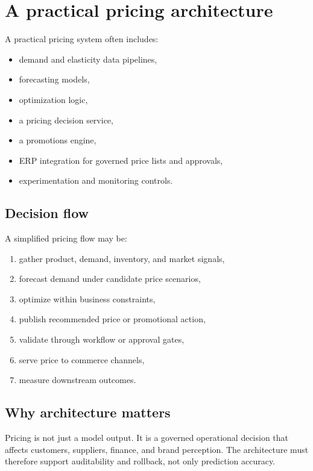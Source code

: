 \section{A practical pricing architecture}
A practical pricing system often includes:
\begin{itemize}
  \item demand and elasticity data pipelines,
  \item forecasting models,
  \item optimization logic,
  \item a pricing decision service,
  \item a promotions engine,
  \item ERP integration for governed price lists and approvals,
  \item experimentation and monitoring controls.
\end{itemize}

\subsection{Decision flow}
A simplified pricing flow may be:
\begin{enumerate}
  \item gather product, demand, inventory, and market signals,
  \item forecast demand under candidate price scenarios,
  \item optimize within business constraints,
  \item publish recommended price or promotional action,
  \item validate through workflow or approval gates,
  \item serve price to commerce channels,
  \item measure downstream outcomes.
\end{enumerate}

\subsection{Why architecture matters}
Pricing is not just a model output.
It is a governed operational decision that affects customers, suppliers, finance, and brand perception.
The architecture must therefore support auditability and rollback, not only prediction accuracy.

